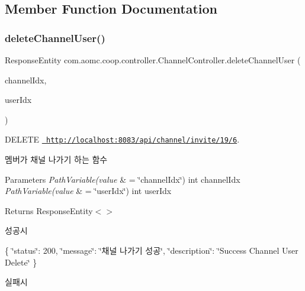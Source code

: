 \subsection{Member Function Documentation}
\mbox{\label{classcom_1_1aomc_1_1coop_1_1controller_1_1_channel_controller_afc894dd365c724ec7dfbf6c75f0d430c}} 
\subsubsection{\texorpdfstring{deleteChannelUser()}{deleteChannelUser()}}
{\footnotesize\ttfamily Response\+Entity com.\+aomc.\+coop.\+controller.\+Channel\+Controller.\+delete\+Channel\+User (\begin{DoxyParamCaption}\item[{@Path\+Variable(value=\char`\"{}channel\+Idx\char`\"{}) int}]{channel\+Idx,  }\item[{@Path\+Variable(value=\char`\"{}user\+Idx\char`\"{}) int}]{user\+Idx }\end{DoxyParamCaption})}



D\+E\+L\+E\+TE \href{http://localhost:8083/api/channel/invite/19/6}{\texttt{ http\+://localhost\+:8083/api/channel/invite/19/6}}. 

멤버가 채널 나가기 하는 함수


\begin{DoxyParams}{Parameters}
{\em Path\+Variable(value} & = \char`\"{}channel\+Idx\char`\"{}) int channel\+Idx\\
\hline
{\em Path\+Variable(value} & = \char`\"{}user\+Idx\char`\"{}) int user\+Idx\\
\hline
\end{DoxyParams}
\begin{DoxyReturn}{Returns}
Response\+Entity$<$$>$
\end{DoxyReturn}
성공시

\{ \char`\"{}status\char`\"{}\+: 200, \char`\"{}message\char`\"{}\+: \char`\"{}채널 나가기 성공\char`\"{}, \char`\"{}description\char`\"{}\+: \char`\"{}\+Success Channel User Delete\char`\"{} \}

실패시


